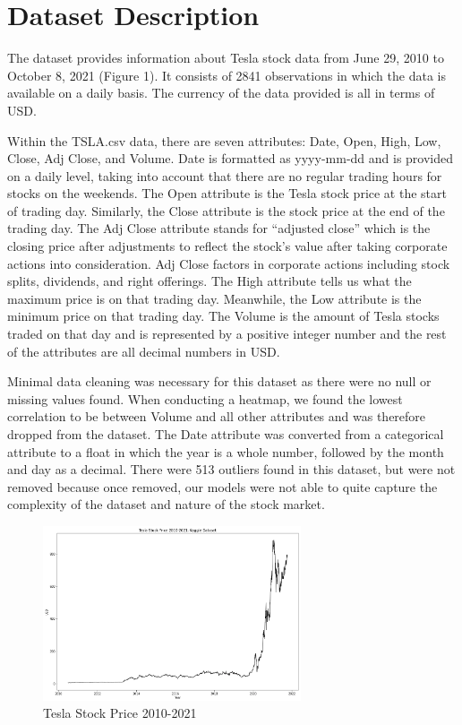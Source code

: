 \documentclass[12pt,a4paper]{article}
\begin{document}
\section{Dataset Description}
The dataset provides information about Tesla stock data from June 29, 2010 to October 8, 2021 (Figure 1). It consists of 2841 observations in which the data is available on a daily basis. The currency of the data provided is all in terms of USD. 

Within the TSLA.csv data, there are seven attributes: Date, Open, High, Low, Close, Adj Close, and Volume. Date is formatted as yyyy-mm-dd and is provided on a daily level, taking into account that there are no regular trading hours for stocks on the weekends. The Open attribute is the Tesla stock price at the start of trading day. Similarly, the Close attribute is the stock price at the end of the trading day. The Adj Close attribute stands for “adjusted close” which is the closing price after adjustments to reflect the stock’s value after taking corporate actions into consideration. Adj Close factors in corporate actions including stock splits, dividends, and right offerings. The High attribute tells us what the maximum price is on that trading day. Meanwhile, the Low attribute is the minimum price on that trading day. The Volume is the amount of Tesla stocks traded on that day and is represented by a positive integer number and the rest of the attributes are all decimal numbers in USD. 

Minimal data cleaning was necessary for this dataset as there were no null or missing values found. When conducting a heatmap, we found the lowest correlation to be between Volume and all other attributes and was therefore dropped from the dataset. The Date attribute was converted from a categorical attribute to a float in which the year is a whole number, followed by the month and day as a decimal. There were 513 outliers found in this dataset, but were not removed because once removed, our models were not able to quite capture the complexity of the dataset and nature of the stock market. 

\begin{figure}[h]
\caption{Tesla Stock Price 2010-2021}
\centering
\includegraphics[width=3in]{./Figures/TSLA.png}
\end{figure}
\end{document}
